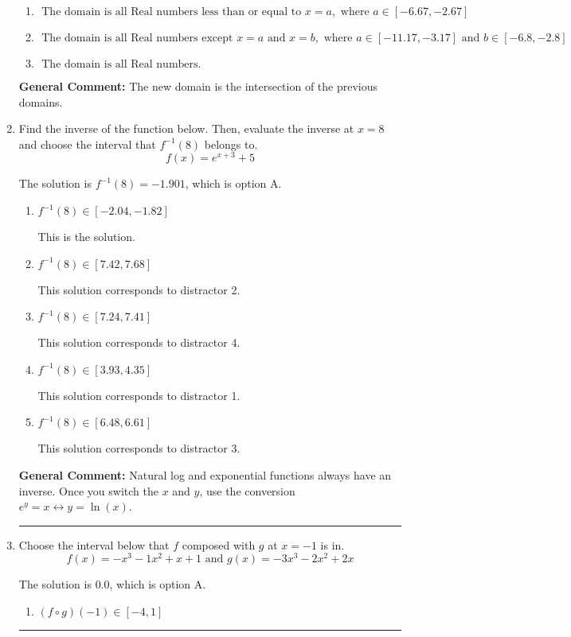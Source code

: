 \documentclass{extbook}[14pt]
\newcommand{\litem}[1]{\item #1

\rule{\textwidth}{0.4pt}}
\begin{document}
\begin{enumerate}
{\begin{enumerate}[label=\Alph*.]
\item \( \text{ The domain is all Real numbers less than or equal to } x = a, \text{ where } a \in [-6.67, -2.67] \)


\item \( \text{ The domain is all Real numbers except } x = a \text{ and } x = b, \text{ where } a \in [-11.17, -3.17] \text{ and } b \in [-6.8, -2.8] \)


\item \( \text{ The domain is all Real numbers. } \)


\end{enumerate}

\textbf{General Comment:} The new domain is the intersection of the previous domains.
}
\litem{
Find the inverse of the function below. Then, evaluate the inverse at $x = 8$ and choose the interval that $f^{-1}(8)$ belongs to.
\[ f(x) = e^{x+3}+5 \]

The solution is \( f^{-1}(8) = -1.901 \), which is option A.\begin{enumerate}[label=\Alph*.]
\item \( f^{-1}(8) \in [-2.04, -1.82] \)

 This is the solution.
\item \( f^{-1}(8) \in [7.42, 7.68] \)

 This solution corresponds to distractor 2.
\item \( f^{-1}(8) \in [7.24, 7.41] \)

 This solution corresponds to distractor 4.
\item \( f^{-1}(8) \in [3.93, 4.35] \)

 This solution corresponds to distractor 1.
\item \( f^{-1}(8) \in [6.48, 6.61] \)

 This solution corresponds to distractor 3.
\end{enumerate}

\textbf{General Comment:} Natural log and exponential functions always have an inverse. Once you switch the $x$ and $y$, use the conversion $ e^y = x \leftrightarrow y=\ln(x)$.
}
\litem{
Choose the interval below that $f$ composed with $g$ at $x=-1$ is in.
\[ f(x) = -x^{3} -1 x^{2} +x + 1 \text{ and } g(x) = -3x^{3} -2 x^{2} +2 x \]

The solution is \( 0.0 \), which is option A.\begin{enumerate}[label=\Alph*.]
\item \( (f \circ g)(-1) \in [-4, 1] \)


\end{enumerate}}
\end{enumerate}
\end{document}
